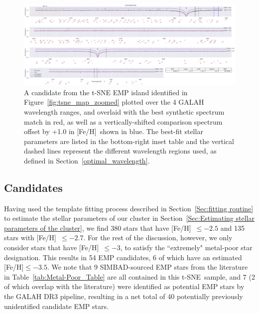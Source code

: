 \documentclass[]{aastex631}
\newcommand{\ts}{t-SNE\xspace}
\newcommand{\emps}{EMP stars\xspace}
\newcommand{\feh}{[Fe/H]\xspace}
\begin{document}
\begin{figure}
\includegraphics[scale=0.4,keepaspectratio]{Plots/Figure10.png}
\caption{A candidate from the \ts EMP island identified in Figure~\ref{fig:tsne_map_zoomed} plotted over the 4 GALAH wavelength ranges, and overlaid with the best synthetic spectrum match in red, as well as a vertically-shifted comparison spectrum offset by +1.0 in \feh \ shown in blue. The best-fit stellar parameters are listed in the bottom-right inset table and the vertical dashed lines represent the different wavelength regions used, as defined in Section~\ref{optimal_wavelength}.}
\label{fig:prime_candidate}
\end{figure}

\subsection{Candidates}\label{Sec:Candidates}
Having used the template fitting process described in Section~\ref{Sec:fitting routine} to estimate the stellar parameters of our cluster in Section~\ref{Sec:Estimating stellar parameters of the cluster}, we find 380 stars that have \feh \ $\leq-2.5$ and 135 stars with  \feh \ $\leq-2.7$. For the rest of the discussion, however, we only consider stars that have \feh \ $\leq-3$, to satisfy the ``extremely" metal-poor star designation. 
This results in 54 EMP candidates,  6 of which have an estimated \feh $\leq-3.5$.
We note that 9 SIMBAD-sourced \emps from the literature in Table~\ref{tab:Metal-Poor_Table} are all contained in this \ts \ sample, and 7 (2 of which overlap with the literature) were identified as potential \emps by the GALAH DR3 pipeline, resulting in a net total of 40 potentially previously unidentified candidate EMP stars.
\end{document}
